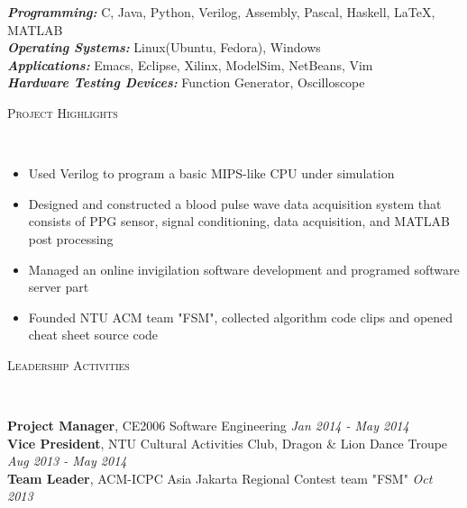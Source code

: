 \documentclass[9pt]{article}
\newenvironment{changemargin}[2]{%
  \begin{list}{}{%
      \setlength{\topsep}{0pt}%
      \setlength{\leftmargin}{#1}%
      \setlength{\rightmargin}{#2}%
      \setlength{\listparindent}{\parindent}%
      \setlength{\itemindent}{\parindent}%
      \setlength{\parsep}{\parskip}%
    }%
  \item[]}{\end{list}
}
\newcommand{\lineover}{
  \begin{changemargin}{-0.05in}{-0.05in}
    \vspace*{-8pt}
    \hrulefill \\
    \vspace*{-2pt}
  \end{changemargin}
}
\newcommand{\header}[1]{
  \begin{changemargin}{-0.5in}{-0.5in}
    \scshape{#1}\\
    \lineover
  \end{changemargin}
}
\newenvironment{body}
{
\vspace*{-16pt}
\begin{changemargin}{-0.25in}{-0.5in}
}	
{
\end{changemargin}
}
\begin{document}
\begin{body}
  \vspace{14pt}
  \emph{\textbf{Programming:}}{} C, Java, Python, Verilog, Assembly, Pascal, Haskell, \LaTeX, MATLAB\\
  \medskip
  \emph{\textbf{Operating Systems:}}{} Linux(Ubuntu, Fedora), Windows\\
  \medskip
  \emph{\textbf{Applications:}}{} Emacs, Eclipse, Xilinx, ModelSim, NetBeans, Vim\\
  \medskip
  \emph{\textbf{Hardware Testing Devices:}}{} Function Generator, Oscilloscope\\
\end{body}

\smallskip
\header{Project Highlights}

\begin{body}
  \vspace{14pt}
  \begin{itemize} \itemsep -0pt
  \item Used Verilog to program a basic MIPS-like CPU under simulation
  \item Designed and constructed a blood pulse wave data acquisition system that consists of PPG sensor, signal conditioning, data acquisition, and MATLAB post processing
  \item Managed an online invigilation software development and programed software server part
  \item Founded NTU ACM team "FSM", collected algorithm code clips and opened cheat sheet source code
  \end{itemize}
\end{body}

\smallskip

\header{Leadership Activities}

\begin{body}
  \vspace{14pt}
  \textbf{Project Manager}, CE2006 Software Engineering \hfill {} \emph{Jan 2014 - May 2014}\\
  \smallskip
  \textbf{Vice President}, NTU Cultural Activities Club, Dragon \& Lion Dance Troupe \hfill{} \emph{Aug 2013 - May 2014}\\
  \smallskip
  \textbf{Team Leader}, ACM-ICPC Asia Jakarta Regional Contest team "FSM" \hfill {} \emph{Oct 2013}\\
\end{body}

\smallskip


%
%
\end{document}
